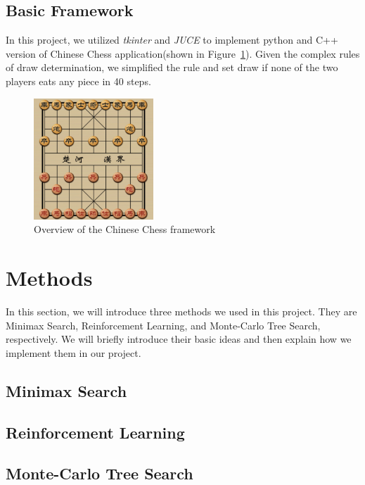 \documentclass[letterpaper]{article}
\begin{document}
    \subsection{Basic Framework}\label{subsec:framework}
    In this project, we utilized \emph{tkinter} and \emph{JUCE} to implement python and C++ version of Chinese Chess application(shown in Figure~\ref{fig:figure}).
    Given the complex rules of draw determination, we simplified the rule and set draw if none of the two players eats any piece in 40 steps.
    \begin{figure}
        \centering
        \includegraphics[width=0.4\textwidth]{img/overview}
        \caption{Overview of the Chinese Chess framework}\label{fig:figure}
    \end{figure}
    \section{Methods}\label{sec:methods}

In this section, we will introduce three methods we used in this project.
They are Minimax Search, Reinforcement Learning, and Monte-Carlo Tree Search, respectively.
We will briefly introduce their basic ideas and then explain how we implement them in our project.

\subsection{Minimax Search}\label{subsec:minimax-search}


\subsection{Reinforcement Learning}\label{subsec:reinforcement-learning}


\subsection{Monte-Carlo Tree Search}
\label{subsec:monte-carlo-tree-search}

\end{document}
